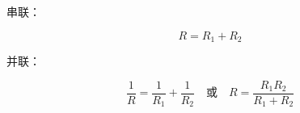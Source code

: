 
\begin{issues}
\issueDraft
\end{issues}


串联：

\begin{equation}
R = R_1 + R_2
\end{equation}

并联：

\begin{equation}
\frac{1}{R} = \frac{1}{R_1} + \frac{1}{R_2}
\quad \text{或} \quad
R = \frac{R_1R_2}{R_1 + R_2}
\end{equation}

